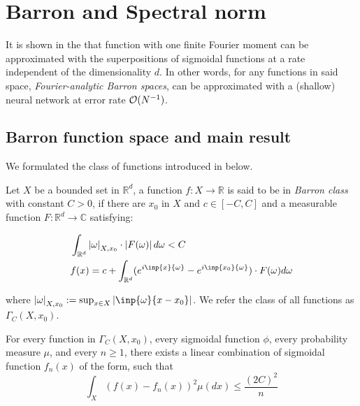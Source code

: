 \chapter{Barron and Spectral norm}


It is shown in the \cite{barron_universal_1993} that function with one finite Fourier moment 
can be approximated with the superpositions of sigmoidal functions at a rate 
independent of the dimensionality $d$. In other words, for any functions in said
space, \textit{Fourier-analytic Barron spaces}, can be approximated
with a (shallow) neural network at error rate $\mathcal{O}(N^{-1})$.


\section{Barron function space and main result}

We formulated the class of functions introduced in \cite{barron_neural_1992, barron_universal_1993} below. 

\begin{definition}
    Let $X$ be a bounded set in $\mathbb{R}^d$, a function 
    $f: X \to \mathbb{R}$ is said to be in
    \textit{Barron class} with constant $C > 0$, if there
    are $x_0$ in $X$ and $c \in [-C, C]$ and a measurable function
    $F: \mathbb{R}^d \to \mathbb{C}$ satisfying:

    \begin{align}
        &\int_{\mathbb{R}^d} \abs{\omega}_{X, x_0} \cdot \abs{F(\omega)} d\omega < C \\
        &f(x) = c + \int_{\mathbb{R}^d} (e^{i\inp{x}{\omega}} - e^{i\inp{x_0}{\omega}}) \cdot F(\omega) d\omega
    \end{align}

    where $\abs{\omega}_{X, x_0} := \sup_{x\in X}\abs{\inp{\omega}{x - x_0}}$.
    We refer the class of all functions as $\Gamma_C(X, x_0)$.
\end{definition}

\begin{theorem}\cite[Theorem~1]{barron_universal_1993}\label{thm:barron_1993_1}
    For every function in $\Gamma_C(X, x_0)$, every sigmoidal function
    $\phi$, every probability measure $\mu$, and every $n \geq 1$,
    there exists a linear combination of sigmoidal function $f_n(x)$ of 
    the form, such that
    \begin{equation}
        \int_X(f(x) - f_n(x))^2 \mu(dx) \leq \frac{(2C)^2}{n}
    \end{equation}
\end{theorem}


